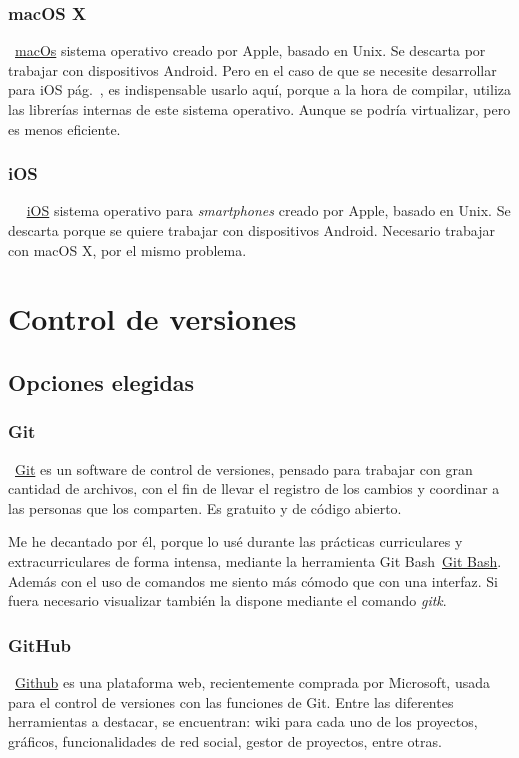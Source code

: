 \subsubsection{macOS X}
~\href{https://www.apple.com/es/macos}{macOs} sistema operativo creado por Apple, basado en Unix. Se descarta por trabajar con dispositivos Android. Pero en el caso de que se necesite desarrollar para iOS pág.~\pageref{ios}, es indispensable usarlo aquí, porque a la hora de compilar, utiliza las librerías internas de este sistema operativo.
Aunque se podría virtualizar, pero es menos eficiente.

\subsubsection{iOS}~\label{ios}
~\href{https://www.apple.com/es/ios}{iOS} sistema operativo para \emph{smartphones} creado por Apple, basado en Unix. Se descarta porque se quiere trabajar con dispositivos Android. Necesario trabajar con macOS X, por el mismo problema.

\section{Control de versiones}

\subsection{Opciones elegidas}

\subsubsection{Git}
~\href{https://git-scm.com//}{Git} es un software de control de versiones, pensado para trabajar con gran cantidad de archivos, con el fin de llevar el registro de los cambios y coordinar a las personas que los comparten. Es gratuito y de código abierto.

Me he decantado por él, porque lo usé durante las prácticas curriculares y extracurriculares de forma intensa, mediante la herramienta Git Bash~\href{https://git-scm.com/download/win}{Git Bash}. Además con el uso de comandos me siento más cómodo que con una interfaz. Si fuera necesario visualizar también la dispone mediante el comando \emph{gitk}.

\subsubsection{GitHub}\label{github}
~\href{https://github.com/}{Github} es una plataforma web, recientemente comprada por Microsoft, usada para el control de versiones con las funciones de Git. Entre las diferentes herramientas a destacar, se encuentran: wiki para cada uno de los proyectos, gráficos, funcionalidades de red social, gestor de proyectos, entre otras.

